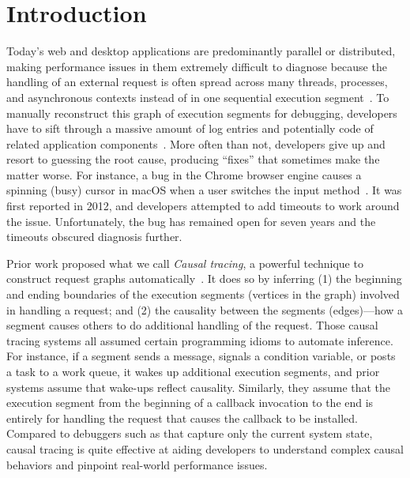\section{Introduction} \label{sec:intro}

Today's web and desktop applications are predominantly parallel or
distributed, making performance issues in them extremely difficult to
diagnose because the handling of an external request is often spread across
many threads, processes, and asynchronous contexts instead of in one
sequential execution segment~\cite{harter2012file}. To manually reconstruct
this graph of execution segments for debugging, developers have to sift
through a massive amount of log entries and potentially code of related
application components~\cite{chen2002pinpoint, zhao2016non, xu2009detecting,
nagaraj2012structured, yuan2012conservative}. More often than not, developers
give up and resort to guessing the root cause, producing ``fixes'' that
sometimes make the matter worse. For instance, a bug in the Chrome browser
engine causes a spinning (busy) cursor in macOS when a user switches the input
method~\cite{chromiumbugreport}. It was first reported in 2012, and developers
attempted to add timeouts to work around the issue. Unfortunately, the bug has
remained open for seven years and the timeouts obscured diagnosis further.

Prior work proposed what we call \emph{Causal tracing}, a powerful technique to
construct request graphs automatically~\cite{reynolds2006pip, fonseca2007x,
benjamin2010dapper, zhang2013panappticon, ravindranath2012appinsight}.  It does
so by inferring (1) the beginning and ending boundaries of the execution
segments (vertices in the graph) involved in handling a request; and (2) the
causality between the segments (edges)---how a segment causes others to do
additional handling of the request. Those causal tracing systems all assumed
certain programming idioms to automate inference. For instance, if a segment
sends a message, signals a condition variable, or posts a task to a work queue,
it wakes up additional execution segments, and prior systems assume that
wake-ups reflect causality. Similarly, they assume that the execution segment
from the beginning of a callback invocation to the end is entirely for handling
the request that causes the callback to be installed.  Compared to debuggers
such as \spindump that capture only the current system state, causal tracing is
quite effective at aiding developers to understand complex causal behaviors and
pinpoint real-world performance issues.

